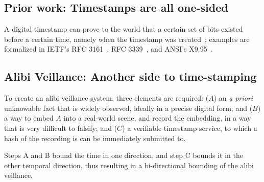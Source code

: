 \subsection{Prior work: Timestamps are all one-sided}
A digital timestamp can prove to the world that a certain set of bits
existed before a certain time, namely when the timestamp was
created~\cite{schneier1995}; examples are
formalized in IETF's RFC 3161~\cite{rfc3161}, RFC 3339~\cite{rfc3339}, and
ANSI's X9.95~\cite{ansi-x9.95}.

\subsection{Alibi Veillance: Another side to time-stamping}
To create an alibi veillance system,
three elements are required: ($A$) an \emph{a priori} unknowable
fact that is widely observed, ideally in a precise digital form; and
($B$) a way to embed $A$ into a real-world scene, and record the
embedding, in a way that is very
difficult to falsify; and ($C$) a verifiable
timestamp service, to which a hash of the recording is can be immediately
submitted to.

Steps A and B bound the time in one direction, and step C bounds it in the
other temporal direction, thus resulting in a bi-directional bounding of the
alibi veillance.

